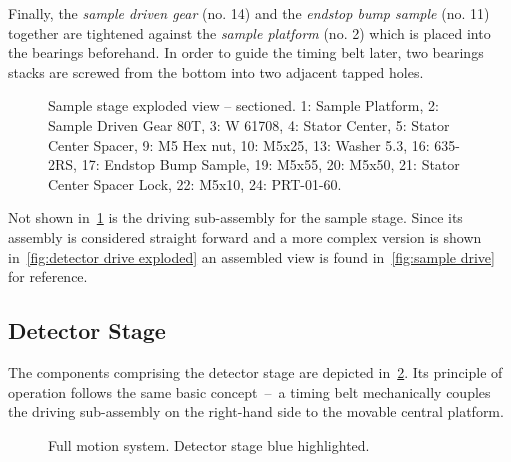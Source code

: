             Finally, the \textit{sample driven gear} (no. 14) and the \textit{endstop bump sample} (no. 11) together are tightened against the \textit{sample platform} (no. 2) which is placed into the bearings beforehand.
            In order to guide the timing belt later, two bearings stacks are screwed from the bottom into two adjacent tapped holes.

            \begin{figure}[h]
                \centering
                \caption[Sample stage exploded view -- sectioned.]{Sample stage exploded view -- sectioned. 1: Sample Platform, 2: Sample Driven Gear 80T, 3: W 61708, 4: Stator Center, 5: Stator Center Spacer, 9: M5 Hex nut, 10: M5x25, 13: Washer 5.3, 16: 635-2RS, 17: Endstop Bump Sample, 19: M5x55, 20: M5x50, 21: Stator Center Spacer Lock, 22: M5x10, 24: PRT-01-60.}%
                \label{fig:sample stage exploded section}%
            \end{figure}%
            Not shown in~\cref{fig:sample stage exploded section} is the driving sub-assembly for the sample stage.
            Since its assembly is considered straight forward and a more complex version is shown in~\cref{fig:detector drive exploded} an assembled view is found in~\cref{fig:sample drive} for reference.

        \subsection{Detector Stage}\label{sec:detector stage}
            The components comprising the detector stage are depicted in~\cref{fig:xmagix full detector highlightes}.
            Its principle of operation follows the same basic concept~--~a timing belt mechanically couples the driving sub-assembly on the right-hand side to the movable central platform.
            \begin{figure}[ht]
                \centering
                \caption[Full motion system. Detector stage blue highlighted.]{Full motion system. Detector stage blue highlighted.}%
                \label{fig:xmagix full detector highlightes}%
            \end{figure}

